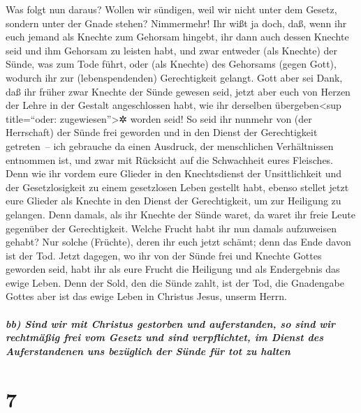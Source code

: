  Was folgt nun daraus? Wollen wir sündigen, weil wir
nicht unter dem Gesetz, sondern unter der Gnade stehen? Nimmermehr!
 Ihr wißt ja doch, daß, wenn ihr euch jemand als Knechte
zum Gehorsam hingebt, ihr dann auch dessen Knechte seid und ihm Gehorsam
zu leisten habt, und zwar entweder (als Knechte) der Sünde, was zum Tode
führt, oder (als Knechte) des Gehorsams (gegen Gott), wodurch ihr zur
(lebenspendenden) Gerechtigkeit gelangt.  Gott aber sei
Dank, daß ihr früher zwar Knechte der Sünde gewesen seid, jetzt aber
euch von Herzen der Lehre in der Gestalt angeschlossen habt, wie ihr
derselben übergeben\textless sup title=``oder: zugewiesen''\textgreater✲
worden seid!  So seid ihr nunmehr von (der Herrschaft)
der Sünde frei geworden und in den Dienst der Gerechtigkeit getreten~--
 ich gebrauche da einen Ausdruck, der menschlichen
Verhältnissen entnommen ist, und zwar mit Rücksicht auf die Schwachheit
eures Fleisches. Denn wie ihr vordem eure Glieder in den Knechtsdienst
der Unsittlichkeit und der Gesetzlosigkeit zu einem gesetzlosen Leben
gestellt habt, ebenso stellet jetzt eure Glieder als Knechte in den
Dienst der Gerechtigkeit, um zur Heiligung zu gelangen. 
Denn damals, als ihr Knechte der Sünde waret, da waret ihr freie Leute
gegenüber der Gerechtigkeit.  Welche Frucht habt ihr nun
damals aufzuweisen gehabt? Nur solche (Früchte), deren ihr euch jetzt
schämt; denn das Ende davon ist der Tod.  Jetzt dagegen,
wo ihr von der Sünde frei und Knechte Gottes geworden seid, habt ihr als
eure Frucht die Heiligung und als Endergebnis das ewige Leben.
 Denn der Sold, den die Sünde zahlt, ist der Tod, die
Gnadengabe Gottes aber ist das ewige Leben in Christus Jesus, unserm
Herrn.

\hypertarget{bb-sind-wir-mit-christus-gestorben-und-auferstanden-so-sind-wir-rechtmuxe4uxdfig-frei-vom-gesetz-und-sind-verpflichtet-im-dienst-des-auferstandenen-uns-bezuxfcglich-der-suxfcnde-fuxfcr-tot-zu-halten}{%
\subparagraph{bb) Sind wir mit Christus gestorben und auferstanden, so
sind wir rechtmäßig frei vom Gesetz und sind verpflichtet, im Dienst des
Auferstandenen uns bezüglich der Sünde für tot zu
halten}\label{bb-sind-wir-mit-christus-gestorben-und-auferstanden-so-sind-wir-rechtmuxe4uxdfig-frei-vom-gesetz-und-sind-verpflichtet-im-dienst-des-auferstandenen-uns-bezuxfcglich-der-suxfcnde-fuxfcr-tot-zu-halten}}

\hypertarget{section-6}{%
\section{7}\label{section-6}}

